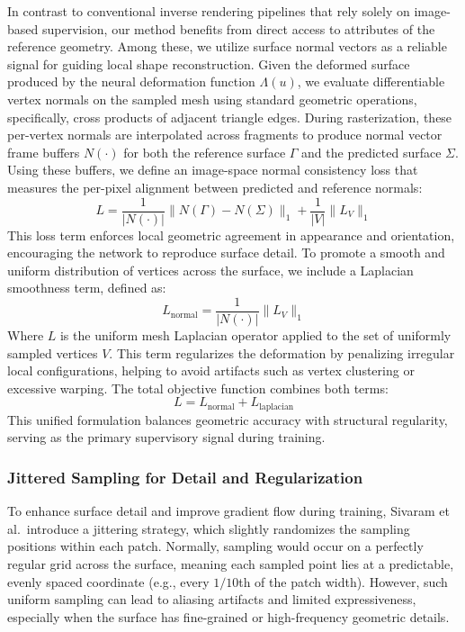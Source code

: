 In contrast to conventional inverse rendering pipelines that rely solely on image-based supervision, our method benefits from direct access to attributes of the reference geometry. 
Among these, we utilize surface normal vectors as a reliable signal for guiding local shape reconstruction. 
Given the deformed surface produced by the neural deformation function $\Lambda(u)$, we evaluate differentiable vertex normals on the sampled mesh using standard geometric operations, specifically, cross products of adjacent triangle edges. 
During rasterization, these per-vertex normals are interpolated across fragments to produce normal vector frame buffers $N(\cdot)$ for both the reference surface $\Gamma$ and the predicted surface $\Sigma$. 
Using these buffers, we define an image-space normal consistency loss that measures the per-pixel alignment between predicted and reference normals: 
\begin{equation} L = \frac{1}{|N(\cdot)|} \|N(\Gamma) - N(\Sigma)\|_1 + \frac{1}{|V|} \|L_V\|_1 \end{equation} 
This loss term enforces local geometric agreement in appearance and orientation, encouraging the network to reproduce surface detail. 
To promote a smooth and uniform distribution of vertices across the surface, we include a Laplacian smoothness term, defined as: 
\begin{equation} L_{\text{normal}} = \frac{1}{|N(\cdot)|} \|L_V\|_1 \end{equation} 
Where $L$ is the uniform mesh Laplacian operator applied to the set of uniformly sampled vertices $V$. 
This term regularizes the deformation by penalizing irregular local configurations, helping to avoid artifacts such as vertex clustering or excessive warping. 
The total objective function combines both terms: 
\begin{equation} L = L_{\text{normal}} + L_{\text{laplacian}} \end{equation} 
This unified formulation balances geometric accuracy with structural regularity, serving as the primary supervisory signal during training.





\subsubsection{Jittered Sampling for Detail and Regularization}

To enhance surface detail and improve gradient flow during training, Sivaram et al.\ introduce a jittering strategy, which slightly randomizes the sampling positions within each patch.  
Normally, sampling would occur on a perfectly regular grid across the surface, meaning each sampled point lies at a predictable, evenly spaced coordinate (e.g., every $1/10$th of the patch width).  
However, such uniform sampling can lead to aliasing artifacts and limited expressiveness, especially when the surface has fine-grained or high-frequency geometric details.  

